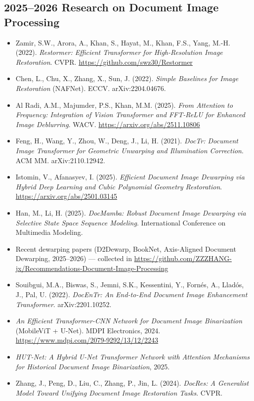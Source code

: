 \documentclass[12pt, a4paper]{article}
\begin{document}
\subsection*{2025--2026 Research on Document Image Processing}
\begin{itemize}
  \item Zamir, S.W., Arora, A., Khan, S., Hayat, M., Khan, F.S., Yang, M.-H. (2022). \textit{Restormer: Efficient Transformer for High-Resolution Image Restoration}. CVPR. \url{https://github.com/swz30/Restormer}
  \item Chen, L., Chu, X., Zhang, X., Sun, J. (2022). \textit{Simple Baselines for Image Restoration} (NAFNet). ECCV. arXiv:2204.04676.
  \item Al Radi, A.M., Majumder, P.S., Khan, M.M. (2025). \textit{From Attention to Frequency: Integration of Vision Transformer and FFT-ReLU for Enhanced Image Deblurring}. WACV. \url{https://arxiv.org/abs/2511.10806}
  \item Feng, H., Wang, Y., Zhou, W., Deng, J., Li, H. (2021). \textit{DocTr: Document Image Transformer for Geometric Unwarping and Illumination Correction}. ACM MM. arXiv:2110.12942.
  \item Istomin, V., Afanasyev, I. (2025). \textit{Efficient Document Image Dewarping via Hybrid Deep Learning and Cubic Polynomial Geometry Restoration}. \url{https://arxiv.org/abs/2501.03145}
  \item Han, M., Li, H. (2025). \textit{DocMamba: Robust Document Image Dewarping via Selective State Space Sequence Modeling}. International Conference on Multimedia Modeling.
  \item Recent dewarping papers (D2Dewarp, BookNet, Axis-Aligned Document Dewarping, 2025--2026) --- collected in \url{https://github.com/ZZZHANG-jx/Recommendations-Document-Image-Processing}
  \item Souibgui, M.A., Biswas, S., Jemni, S.K., Kessentini, Y., Fornés, A., Lladós, J., Pal, U. (2022). \textit{DocEnTr: An End-to-End Document Image Enhancement Transformer}. arXiv:2201.10252.
  \item \textit{An Efficient Transformer-CNN Network for Document Image Binarization} (MobileViT + U-Net). MDPI Electronics, 2024. \url{https://www.mdpi.com/2079-9292/13/12/2243}
  \item \textit{HUT-Net: A Hybrid U-Net Transformer Network with Attention Mechanisms for Historical Document Image Binarization}, 2025.
  \item Zhang, J., Peng, D., Liu, C., Zhang, P., Jin, L. (2024). \textit{DocRes: A Generalist Model Toward Unifying Document Image Restoration Tasks}. CVPR.

\end{itemize}
\end{document}
